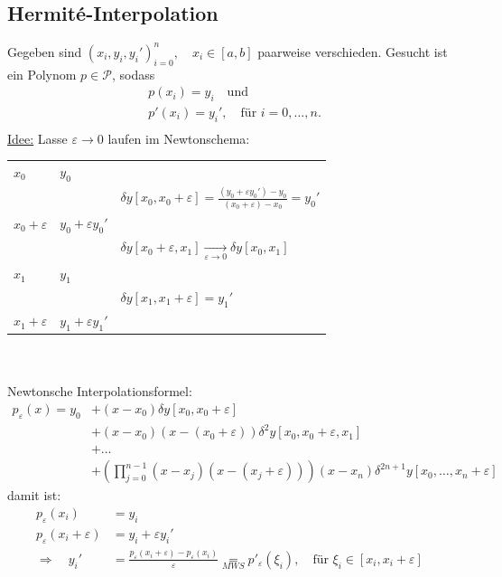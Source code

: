 \documentclass[12pt]{article}
\theoremstyle{break}
\begin{document}
\subsection{Hermit\'{e}-Interpolation}

Gegeben sind $(x_i, y_i, y_i')_{i=0}^n, \quad x_i \in [a,b]$ paarweise verschieden. Gesucht ist ein Polynom $p \in \mathcal{P}$, sodass
\begin{align*}
&p(x_i) = y_i \quad \text{und } &\\
&p'(x_i) = y_i', \quad \text{für } i=0,...,n. &\\
\end{align*}
\underline{Idee:} Lasse $\varepsilon \rightarrow 0$ laufen im Newtonschema:

\begin{tabular}{lll}
 
$x_0$ & $y_0$\\
 & & $\delta y[x_0, x_0+\varepsilon] = \frac{(y_0 + \varepsilon y_0') - y_0}{(x_0 +\varepsilon) - x_0} = y_0'$\\
$x_0+\varepsilon$ & $y_0 + \varepsilon y_0'$\\
 & & $\delta y[x_0+\varepsilon, x_1] \underset{\varepsilon \rightarrow 0}{\rightarrow} \delta y[x_0,x_1]$\\
$x_1$ & $y_1$\\
 & & $\delta y[x_1, x_1+\varepsilon] = y_1'$\\
$x_1+\varepsilon$ & $y_1+\varepsilon y_1'$\\
 
\end{tabular} \\ \\
Newtonsche Interpolationsformel:
\begin{align*}
p_{\varepsilon}(x) = y_0 &+ (x-x_0) \delta y[x_0, x_0+\varepsilon] &\\
&+ (x-x_0)(x-(x_0 + \varepsilon)) \delta^2y[x_0, x_0 + \varepsilon, x_1] &\\
&+ \dots &\\
&+ \left( \prod_{j=0}^{n-1} (x-x_j)(x-(x_j + \varepsilon))\right)(x-x_n)\delta^{2n+1} y[x_0,\dots, x_n + \varepsilon]
\end{align*}
damit ist:
\begin{align*}
p_{\varepsilon}(x_i) &= y_i &\\
p_{\varepsilon}(x_i + \varepsilon) &= y_i + \varepsilon y_i' &\\
\Rightarrow \quad y_i' &= \frac{p_{\varepsilon}(x_i + \varepsilon) - p_{\varepsilon}(x_i)}{\varepsilon} \underset{MWS}{=} p'_{\varepsilon}(\xi_i), \quad \text{für } \xi_i \in [x_i, x_i+\varepsilon]
\end{align*}
\end{document}
